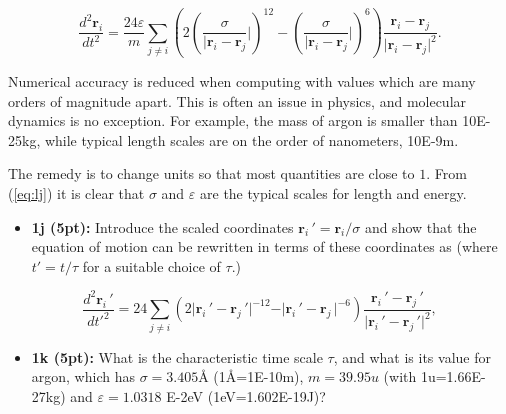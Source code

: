 \documentclass[%
oneside,                 %
final,                   %
10pt]{article}
\begin{document}
\noindent
\[
  \frac{d^2\bm{r}_i}{dt^2} = \frac{24\varepsilon}{m} \sum_{j \neq i} \left(2(\frac{\sigma}{\vert\bm{r}_i-\bm{r}_j}\vert)^{12}-(\frac{\sigma}{\vert\bm{r}_i-\bm{r}_j}\vert)^6\right)\frac{\bm{r}_i-\bm{r}_j}{\vert\bm{r}_i-\bm{r}_j\vert^2}.
\]



Numerical accuracy is reduced when computing with values which are
many orders of magnitude apart. This is often an issue in physics, and
molecular dynamics is no exception. For example, the mass of argon is
smaller than 10E-25kg, while typical length scales are
on the order of nanometers, 10E-9m.

The remedy is to change units so that most quantities are close to
$1$. From (\ref{eq:lj}) it is clear that $\sigma$ and $\varepsilon$
are the typical scales for length and energy.

\begin{itemize}
\item \textbf{1j (5pt):} Introduce the scaled coordinates $\bm{r}_i\,'=\bm{r}_i/\sigma$ and show that the equation of motion can be rewritten in terms of these coordinates as (where $t'=t/\tau$ for a suitable choice of $\tau$.)
\end{itemize}

\noindent
\begin{equation}
\frac{d^2\bm{r}_i\,'}{{dt'^2}} = 24 \sum_{j \neq i} \left(2\vert\bm{r}_i\,'-\bm{r}_j\,'\vert^{-12}-\vert\bm{r}_i\,'-\bm{r}_j\,\vert^{-6}\right)\frac{\bm{r}_i\,'-\bm{r}_j\,'}{\vert\bm{r}_i\,'-\bm{r}_j\,'\vert^2}, \label{eq:undim}
\end{equation}
\begin{itemize}
\item \textbf{1k (5pt):} What is the characteristic time scale $\tau$, and what is its value for argon, which has $\sigma=3.405$Å (1Å=1E-10m), $m = 39.95u$ (with 1u=1.66E-27kg) and $\varepsilon=1.0318$ E-2eV (1eV=1.602E-19J)?
\end{itemize}
\end{document}
